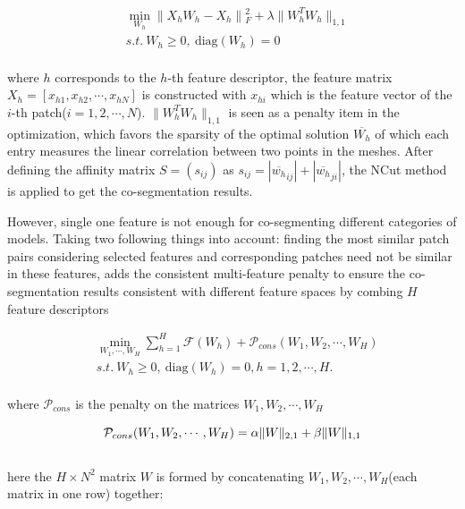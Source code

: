 \small{
\begin{equation}
 \label{eq:SSC}
 \begin{split}
 &\min_{W_{h}}\|X_{h}W_{h}-X_{h}\|{_{F}^2}+\lambda\|W_{h}^{T}W_{h}\|_{1,1} \\
 &s.t.~W_{h}\ge0,~\textrm{diag}(W_{h})=0
 \end{split}
\end{equation}
}
\\
where $h$ corresponds to the $h$-th feature descriptor,
the feature matrix $X_{h}=[x_{h1},x_{h2},\cdots,x_{hN}]$ is constructed with $x_{hi}$ which is the feature vector of the $i$-th patch($i=1,2,\cdots,N$).
$\|W_{h}^{T}W_{h}\|_{1,1}$ is seen as a penalty item in the optimization, which favors the sparsity of the optimal solution $\overline{W_{h}}$ of which each entry measures the linear correlation between two points in the meshes.
After defining the affinity matrix $S=(s_{ij})$ as $s_{ij}=|\overline{w_{h}}_{ij}|+|\overline{w_{h}}_{ji}|$, the NCut method\cite{shi2000normalized} is applied to get the co-segmentation results.

However, single one feature is not enough for co-segmenting different categories of models.
Taking two following things into account:
finding the most similar patch pairs considering selected features and corresponding patches need not be similar in these features,
\cite{hu2012co} adds the consistent multi-feature penalty to ensure the co-segmentation results consistent with different feature spaces by combing $H$ feature descriptors

\small{
\begin{equation}
 \label{eq:SSC}
 \begin{split}
 &\min_{W_{1},\cdots,W_{H}}\sum_{h=1}^{H}\mathcal{F}(W_{h})+\mathcal{P}_{cons}(W_1,W_2,\cdots,W_H)\\
 &s.t.~W_{h}\ge0,~\textrm{diag}(W_{h})=0,h=1,2,\cdots,H.
 \end{split}
\end{equation}
}
\\
where $\mathcal{P}_{cons}$ is the penalty on the matrices $W_1,W_2,\cdots,W_H$

\small{
\begin{equation}
 \label{eq:SSC}
 \mathcal{P}_{cons}(W_1,W_2,\cdots,W_H)=\alpha\|W\|_{2,1}+\beta\|W\|_{1,1}\\
\end{equation}
}
\\
here the $H\times N^2$ matrix $W$ is formed by concatenating $W_1,W_2,\cdots,W_H$(each matrix in one row) together:

